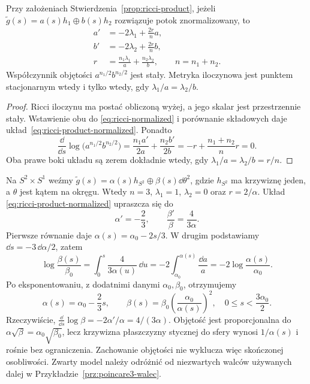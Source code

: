 \begin{stwierdzenie}
\label{prop:ricci-product-normalized}
Przy założeniach Stwierdzenia~\ref{prop:ricci-product},
jeżeli $\widetilde g(s)=a(s)h_1\oplus b(s)h_2$
rozwiązuje potok znormalizowany, to
\begin{equation}\label{eq:ricci-product-normalized}
 \begin{aligned}
 a'&=-2\lambda_1+\frac{2r}{n}a,\\
 b'&=-2\lambda_2+\frac{2r}{n}b,\\
 r&=\frac{n_1\lambda_1}{a}
    +\frac{n_2\lambda_2}{b},\qquad n=n_1+n_2.
 \end{aligned}
\end{equation}
Współczynnik objętości $a^{n_1/2}b^{n_2/2}$ jest stały.
Metryka iloczynowa jest punktem stacjonarnym wtedy
i tylko wtedy, gdy $\lambda_1/a=\lambda_2/b$.
\end{stwierdzenie}
\begin{proof}
Ricci iloczynu ma postać obliczoną wyżej, a jego
skalar jest przestrzennie stały. Wstawienie obu do
\eqref{eq:ricci-normalized} i porównanie składowych
daje układ~\eqref{eq:ricci-product-normalized}.
Ponadto
\[
 \frac{\dd}{\dd s}\log
     \bigl(a^{n_1/2}b^{n_2/2}\bigr)
 =\frac{n_1a'}{2a}+\frac{n_2b'}{2b}
 =-r+\frac{n_1+n_2}{n}r=0.
\]
Oba prawe boki układu są zerem dokładnie wtedy,
gdy $\lambda_1/a=\lambda_2/b=r/n$.
\end{proof}

\begin{przyklad}
\label{prz:ricci-sphere-circle-normalized}
Na $S^2\times S^1$ weźmy
$\widetilde g(s)=\alpha(s)h_{S^2}\oplus\beta(s)\dd\theta^2$,
gdzie $h_{S^2}$ ma krzywiznę jeden, a $\theta$ jest
kątem na okręgu. Wtedy $n=3$, $\lambda_1=1$,
$\lambda_2=0$ oraz $r=2/\alpha$. Układ
\eqref{eq:ricci-product-normalized} upraszcza się do
\[
 \alpha'=-\frac23,\qquad
 \frac{\beta'}{\beta}=\frac{4}{3\alpha}.
\]
Pierwsze równanie daje $\alpha(s)=\alpha_0-2s/3$.
W drugim podstawiamy $\dd s=-3\,\dd\alpha/2$, zatem
\[
 \log\frac{\beta(s)}{\beta_0}
 =\int_0^s\frac{4}{3\alpha(u)}\,\dd u
 =-2\int_{\alpha_0}^{\alpha(s)}\frac{\dd a}{a}
 =-2\log\frac{\alpha(s)}{\alpha_0}.
\]
Po eksponentowaniu, z dodatnimi danymi $\alpha_0,\beta_0$,
otrzymujemy
\begin{equation}\label{eq:ricci-sphere-circle-normalized}
 \alpha(s)=\alpha_0-\frac23s,\qquad
 \beta(s)=\beta_0
     \left(\frac{\alpha_0}{\alpha(s)}\right)^2,
 \quad 0\leq s<\frac{3\alpha_0}{2}.
\end{equation}
Rzeczywiście,
$\frac{\dd}{\dd s}\log\beta
=-2\alpha'/\alpha=4/(3\alpha)$.
Objętość jest proporcjonalna do
$\alpha\sqrt\beta=\alpha_0\sqrt{\beta_0}$,
lecz krzywizna płaszczyzny stycznej do sfery wynosi
$1/\alpha(s)$ i rośnie bez ograniczenia. Zachowanie
objętości nie wyklucza więc skończonej osobliwości.
Zwarty model należy odróżnić od niezwartych walców
używanych dalej w Przykładzie~\ref{prz:poincare3-walec}.
\end{przyklad}

